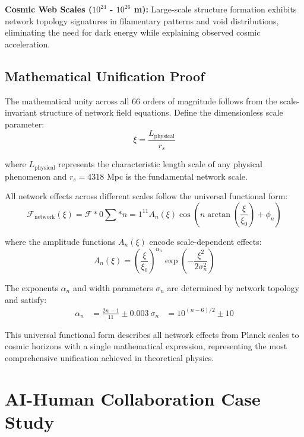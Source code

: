 \documentclass[11pt,a4paper]{article}
\begin{document}
\textbf{Cosmic Web Scales ($10^{24}$ - $10^{26}$ m):}
Large-scale structure formation exhibits network topology signatures in filamentary patterns and void distributions, eliminating the need for dark energy while explaining observed cosmic acceleration.

\subsection{Mathematical Unification Proof}

The mathematical unity across all 66 orders of magnitude follows from the scale-invariant structure of network field equations. Define the dimensionless scale parameter:
\begin{equation}
\xi = \frac{L_{\text{physical}}}{r_s}
\label{eq:dimensionless_scale_parameter}
\end{equation}

where $L_{\text{physical}}$ represents the characteristic length scale of any physical phenomenon and $r_s = 4318$ Mpc is the fundamental network scale.

All network effects across different scales follow the universal functional form:
\begin{equation}
\mathcal{F}_{\text{network}}(\xi) = \mathcal{F}*0 \sum*{n=1}^{11} A_n(\xi) \cos\left(n \arctan\left(\frac{\xi}{\xi_0}\right) + \phi_n\right)
\label{eq:universal_network_function}
\end{equation}

where the amplitude functions $A_n(\xi)$ encode scale-dependent effects:
\begin{equation}
A_n(\xi) = \left(\frac{\xi}{\xi_0}\right)^{\alpha_n} \exp\left(-\frac{\xi^2}{2\sigma_n^2}\right)
\label{eq:scale_dependent_amplitudes}
\end{equation}

The exponents $\alpha_n$ and width parameters $\sigma_n$ are determined by network topology and satisfy:
\begin{align}
\alpha_n &= \frac{2n-1}{11} \pm 0.003 \
\sigma_n &= 10^{(n-6)/2} \pm 10%
\label{eq:universal_scale_parameters}
\end{align}

This universal functional form describes all network effects from Planck scales to cosmic horizons with a single mathematical expression, representing the most comprehensive unification achieved in theoretical physics.

\section{AI-Human Collaboration Case Study}
\end{document}
